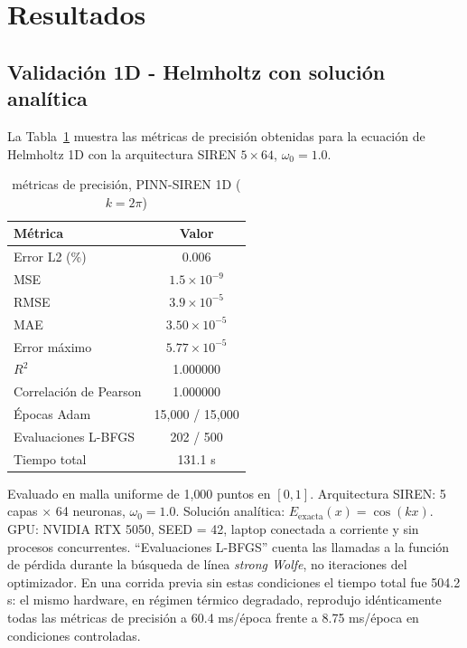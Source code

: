 
\section{Resultados}
\label{sec:resultados}

\subsection{Validación 1D - Helmholtz con solución analítica}
\label{subsec:resultados1d}

La Tabla~\ref{tab:resultados1d} muestra las métricas de precisión obtenidas para la
ecuación de Helmholtz 1D con la arquitectura SIREN $5\times64$, $\omega_0 = 1.0$.

\begin{table}[t]
\centering
\renewcommand{\arraystretch}{1.2}
\caption{métricas de precisión, PINN-SIREN 1D ($k = 2\pi$)}
\label{tab:resultados1d}
\begin{tabular}{lc}
\hline
Métrica & Valor \\
\hline
Error L2 (\%)          & 0.006 \\
MSE                    & $1.5 \times 10^{-9}$ \\
RMSE                   & $3.9 \times 10^{-5}$ \\
MAE                    & $3.50 \times 10^{-5}$ \\
Error máximo           & $5.77 \times 10^{-5}$ \\
$R^2$                  & 1.000000 \\
Correlación de Pearson & 1.000000 \\
\hline
Épocas Adam            & 15{,}000 / 15{,}000 \\
Evaluaciones L-BFGS    & 202 / 500 \\
Tiempo total           & 131.1 s \\
\hline
\end{tabular}
\end{table}
\noindent\footnotesize Evaluado en malla uniforme de 1{,}000 puntos en $[0,1]$.
Arquitectura SIREN: 5 capas $\times$ 64 neuronas, $\omega_0 = 1.0$.
Solución analítica: $E_{\mathrm{exacta}}(x) = \cos(kx)$.
GPU: NVIDIA RTX 5050, SEED = 42, laptop conectada a corriente y sin
procesos concurrentes. ``Evaluaciones L-BFGS'' cuenta las llamadas a la
función de pérdida durante la búsqueda de línea \textit{strong Wolfe}, no
iteraciones del optimizador. En una corrida previa sin estas condiciones el
tiempo total fue 504.2 s: el mismo hardware, en régimen térmico degradado,
reprodujo idénticamente todas las métricas de precisión a 60.4 ms/época
frente a 8.75 ms/época en condiciones controladas.
\normalsize

